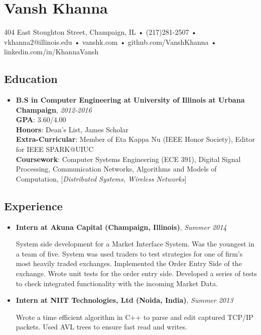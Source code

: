 \documentclass[]{article}
\author{}
\date{}
\begin{document}
\section{Vansh Khanna}

404 East Stoughton Street, Champaign, IL • (217)281-2507 •
vkhanna2@illinois.edu • vanshk.com • github.com/VanshKhanna •
linkedin.com/in/KhannaVansh

\subsection{Education}

\begin{itemize}
\item
  \textbf{B.S in Computer Engineering at University of Illinois at
  Urbana Champaign}, \emph{2012-2016}\\ \textbf{GPA}: 3.60/4.00\\
  \textbf{Honors}: Dean's List, James Scholar\\
  \textbf{Extra-Curricular}: Member of Eta Kappa Nu (IEEE Honor
  Society), Editor for IEEE SPARK@UIUC\\ \textbf{Coursework}: Computer
  Systems Engineering (ECE 391), Digital Signal Processing,
  Communication Networks, Algorithms and Models of Computation,
  {[}\emph{Distributed Systems, Wireless Networks}{]}
\end{itemize}

\subsection{Experience}

\begin{itemize}
\item
  \textbf{Intern at Akuna Capital (Champaign, Illinois)}, \emph{Summer
  2014}

  System side development for a Market Interface System. Was the
  youngest in a team of five. System was used traders to test strategies
  for one of firm's most heavily traded exchanges. Implemented the Order
  Entry Side of the exchange. Wrote unit tests for the order entry side.
  Developed a series of tests to check integrated functionality with the
  incoming Market Data.
\item
  \textbf{Intern at NIIT Technologies, Ltd (Noida, India)}, \emph{Summer
  2013}

  Wrote a time efficient algorithm in C++ to parse and edit captured
  TCP/IP packets. Used AVL trees to ensure fast read and writes.
\end{itemize}
\end{document}
